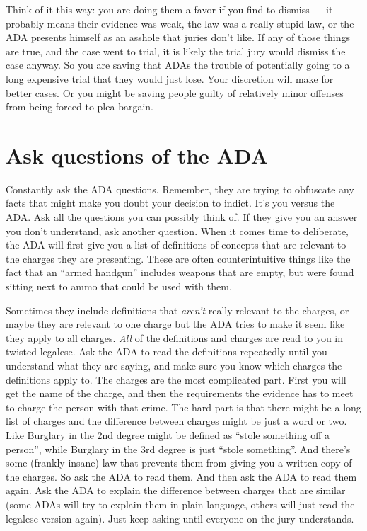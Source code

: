 \documentclass[letterpaper]{article}
\begin{document}
Think of it this way: you are doing them a favor if you find to dismiss --- it probably means their evidence was weak, the law was a really stupid law, or the ADA presents himself as an asshole that juries don't like. 
If any of those things are true, and the case went to trial, it is likely the trial jury would dismiss the case anyway. 
So you are saving that ADAs the trouble of potentially going to a long expensive trial that they would just lose. Your discretion will make for better cases.
Or you might be saving people guilty of relatively minor offenses from being forced to plea bargain.


\section*{Ask questions of the ADA}
Constantly ask the ADA questions. 
Remember, they are trying to obfuscate any facts that might make you doubt your decision to indict.  
It's you versus the ADA. 
Ask all the questions you can possibly think of. 
If they give you an answer you don't understand, ask another question. 
When it comes time to deliberate, the ADA will first give you a list of definitions of concepts that are relevant to the charges they are presenting. 
These are often counterintuitive things like the fact that an ``armed handgun'' includes weapons that are empty, but were found sitting next to ammo that could be used with them.

Sometimes they include definitions that \emph{aren't} really relevant to the charges, or maybe they are relevant to one charge but the ADA tries to make it seem like they apply to all charges. 
\emph{All} of the definitions and charges are read to you in twisted legalese.
Ask the ADA to read the definitions repeatedly until you understand what they are saying, and make sure you know which charges the definitions apply to.  
The charges are the most complicated part. 
First you will get the name of the charge, and then the requirements the evidence has to meet to charge the person with that crime. 
The hard part is that there might be a long list of charges and the difference between charges might be just a word or two. 
Like Burglary in the 2nd degree might be defined as ``stole something off a person'', while Burglary in the 3rd degree is just ``stole something''. 
And there's some (frankly insane) law that prevents them from giving you a written copy of the charges. 
So ask the ADA to read them. 
And then ask the ADA to read them again. 
Ask the ADA to explain the difference between charges that are similar (some ADAs will try to explain them in plain language, others will just read the legalese version again). 
Just keep asking until everyone on the jury understands.
\end{document}
